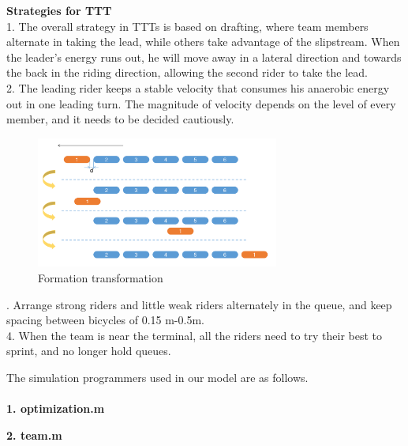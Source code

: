 \documentclass{mcmthesis}
\begin{document}
\begin{spacing}{1.2}
\noindent \textbf{Strategies for TTT}\\
1. The overall strategy in TTTs is based on drafting, where team members alternate in taking the lead, while others take advantage of the slipstream. When the leader's energy runs out, he will move away in a lateral direction and towards the back in the riding direction, allowing the second rider to take the lead.\\
2. The leading rider keeps a stable velocity that consumes his anaerobic energy out in one leading turn. The magnitude of velocity depends on the level of every member, and it needs to be decided cautiously.
\begin{figure}[H]
\small
\centering
\includegraphics[width=8cm]{mcmthesis/figures/team change.png}
\caption{Formation transformation} 
\end{figure}
. Arrange strong riders and little weak riders alternately in the queue, and keep spacing between bicycles of 0.15 m-0.5m.\\
4. When the team is near the terminal, all the riders need to try their best to sprint, and no longer hold queues.

\end{spacing} 
\newpage
% 



% 

\newpage
\begin{appendices}
\noindent The simulation programmers used in our model are as follows.\\
\\
\textbf{1. optimization.m}

\textbf{2. team.m}


% 

% 

\end{appendices}
\end{document}
